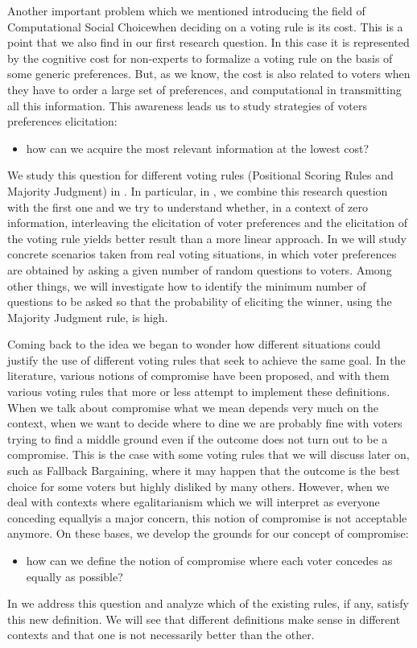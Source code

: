 Another important problem \textemdash which we mentioned introducing the field of Computational Social Choice\textemdash when deciding on a voting rule is its cost. This is a point that we also find in our first research question. 
In this case it is represented by the cognitive cost for non-experts to formalize a voting rule on the basis of some generic preferences. But, as we know, the cost is also related to voters when they have to order a large set of preferences, and computational in transmitting all this information.
This awareness leads us to study strategies of voters preferences elicitation:
\begin{itemize}
	\item how can we acquire the most relevant information at the lowest cost?
\end{itemize}
We study this question for different voting rules (Positional Scoring Rules and Majority Judgment) in . In particular, in , we combine this research question with the first one and we try to understand whether, in a context of zero information, interleaving the elicitation of voter preferences and the elicitation of the voting rule yields better result than a more linear approach. 
In  we will study concrete scenarios taken from real voting situations, in which voter preferences are obtained by asking a given number of random questions to voters. Among other things, we will investigate how to identify the minimum number of questions to be asked so that the probability of eliciting the winner, using the Majority Judgment rule, is high.

Coming back to the idea  we began to wonder how different situations could justify the use of different voting rules that seek to achieve the same goal.
In the literature, various notions of compromise have been proposed, and with them various voting rules that more or less attempt to implement these definitions.
When we talk about compromise what we mean depends very much on the context, when we want to decide where to dine we are probably fine with voters trying to find a middle ground even if the outcome does not turn out to be a compromise. This is the case with some voting rules that we will discuss later on, such as Fallback Bargaining, where it may happen that the outcome is the best choice for some voters but highly disliked by many others.
However, when we deal with contexts where egalitarianism \textemdash which we will interpret as everyone conceding equally\textemdash is a major concern, this notion of compromise is not acceptable anymore.
On these bases, we develop the grounds for our concept of compromise:
\begin{itemize}
	\item how can we define the notion of compromise where each voter concedes as equally as possible?
\end{itemize}
In  we address this question and analyze which of the existing rules, if any, satisfy this new definition. We will see that different definitions make sense in different contexts and that one is not necessarily better than the other.

